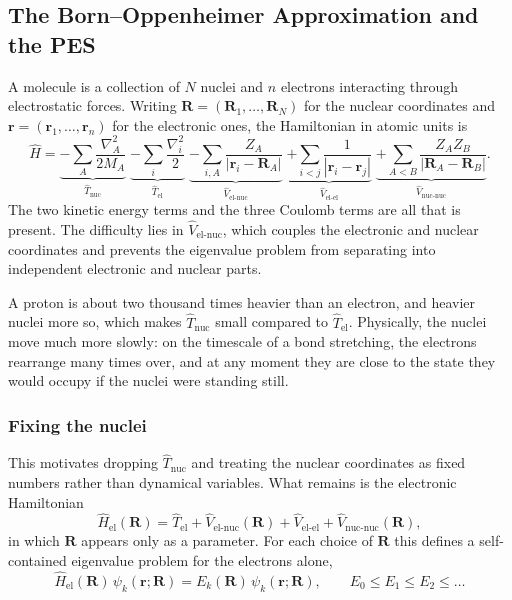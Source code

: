 \subsection{The Born--Oppenheimer Approximation and the PES}
\label{sec:background-bo}
A molecule is a collection of $N$ nuclei and $n$ electrons interacting through
electrostatic forces. Writing $\mathbf{R} = (\mathbf{R}_1,\dots,\mathbf{R}_N)$ for
the nuclear coordinates and $\mathbf{r} = (\mathbf{r}_1,\dots,\mathbf{r}_n)$ for
the electronic ones, the Hamiltonian in atomic units is
\begin{equation}
\hat{H}
= \underbrace{-\sum_A \frac{\nabla_A^2}{2M_A}}_{\hat{T}_\text{nuc}}
\; \underbrace{- \sum_i \frac{\nabla_i^2}{2}}_{\hat{T}_\text{el}}
\; \underbrace{- \sum_{i,A} \frac{Z_A}{|\mathbf{r}_i - \mathbf{R}_A|}}_{\hat{V}_\text{el-nuc}}
\; \underbrace{+ \sum_{i<j} \frac{1}{|\mathbf{r}_i - \mathbf{r}_j|}}_{\hat{V}_\text{el-el}}
\; \underbrace{+ \sum_{A<B} \frac{Z_A Z_B}{|\mathbf{R}_A - \mathbf{R}_B|}}_{\hat{V}_\text{nuc-nuc}} .
\label{eq:molecular-hamiltonian}
\end{equation}
The two kinetic energy terms and the three Coulomb terms are all that is present.
The difficulty lies in $\hat{V}_\text{el-nuc}$, which couples the electronic and
nuclear coordinates and prevents the eigenvalue problem from separating into
independent electronic and nuclear parts.

A proton is about two thousand times heavier than an electron, and heavier nuclei more so, which makes
$\hat{T}_\text{nuc}$ small compared to $\hat{T}_\text{el}$. Physically, the nuclei
move much more slowly: on the timescale of a bond stretching, the electrons
rearrange many times over, and at any moment they are close to the state they
would occupy if the nuclei were standing still.

\subsubsection*{Fixing the nuclei}
This motivates dropping $\hat{T}_\text{nuc}$ and treating the nuclear coordinates
as fixed numbers rather than dynamical variables. What remains is the electronic
Hamiltonian
\begin{equation}
\hat{H}_\text{el}(\mathbf{R})
= \hat{T}_\text{el} + \hat{V}_\text{el-nuc}(\mathbf{R}) + \hat{V}_\text{el-el}
+ \hat{V}_\text{nuc-nuc}(\mathbf{R}),
\label{eq:electronic-hamiltonian}
\end{equation}
in which $\mathbf{R}$ appears only as a parameter. For each choice of $\mathbf{R}$
this defines a self-contained eigenvalue problem for the electrons alone,
\begin{equation}
\hat{H}_\text{el}(\mathbf{R})\, \psi_k(\mathbf{r};\mathbf{R})
= E_k(\mathbf{R})\, \psi_k(\mathbf{r};\mathbf{R}),
\qquad E_0 \le E_1 \le E_2 \le \dots
\label{eq:electronic-schrodinger}
\end{equation}

